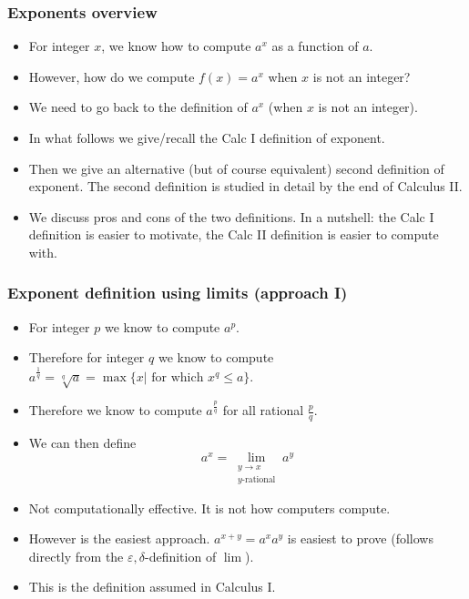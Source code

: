 \begin{frame}
\frametitle{Exponents overview}
\begin{itemize}
\item<1-> For integer $x$, we know how to compute $a^{x}$ as a function of $a$. 
\item<2-> However, how do we compute $f(x)=a^x$ when $x$ is not an integer?
\item<3-> We need to go back to the definition of $a^x$ (when $x$ is not an integer).
\item<4-> In what follows we give/recall the Calc I definition of exponent.
\item<5-> Then we give an alternative (but of course equivalent) second definition of exponent. The second definition is studied in detail by the end of Calculus II. 
\item<6-> We discuss pros and cons of the two definitions. In a nutshell: the Calc I definition is easier to motivate, the Calc II definition is easier to compute with.
\end{itemize}
\end{frame}
\begin{frame}
\frametitle{Exponent definition using limits (approach I)}
\begin{itemize}
\item<1-> For integer $p$ we know to compute $a^p$.
\item<2-> Therefore for integer $q$ we know to compute $a^{\frac{1}{q}}= \sqrt[q]{a}=\max\{x|\text{~for~which~} x^q\leq a\}$.
\item<3-> Therefore we know to compute $a^{\frac{p}{q}}$ for all rational $\frac{p}{q}$.
\item<4-> We can then define
\[
a^x = \lim\limits_{\substack{y \to x \\ y\text{-rational}}} a^y 
\]
\item<5-> Not computationally effective. It is not how computers compute.
\item<6-> However is the easiest approach. $a^{x+y}=a^xa^y$ is easiest to prove (follows directly from the $\varepsilon, \delta$-definition of $\lim$).
\item<7->\alert<7->{This is the definition assumed in Calculus I.}
\end{itemize}
\end{frame}
